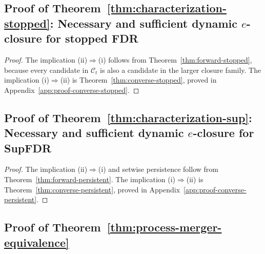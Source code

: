 \documentclass[11pt]{article}
\numberwithin{equation}{section}
\theoremstyle{plain}
\theoremstyle{definition}
\newcommand{\C}{\mathcal C}
\begin{document}
\subsection{Proof of Theorem~\ref{thm:characterization-stopped}: Necessary and sufficient dynamic \texorpdfstring{$e$}{e}-closure for stopped FDR}\label{app:proof-char-stopped}

\begin{proof}
The implication (ii)$\Rightarrow$(i) follows from Theorem~\ref{thm:forward-stopped}, because every candidate in $\C_t$ is also a candidate in the larger closure family. The implication (i)$\Rightarrow$(ii) is Theorem~\ref{thm:converse-stopped}, proved in Appendix~\ref{app:proof-converse-stopped}.
\end{proof}

\subsection{Proof of Theorem~\ref{thm:characterization-sup}: Necessary and sufficient dynamic \texorpdfstring{$e$}{e}-closure for SupFDR}\label{app:proof-char-sup}

\begin{proof}
The implication (ii)$\Rightarrow$(i) and setwise persistence follow from Theorem~\ref{thm:forward-persistent}. The implication (i)$\Rightarrow$(ii) is Theorem~\ref{thm:converse-persistent}, proved in Appendix~\ref{app:proof-converse-persistent}.
\end{proof}

\subsection{Proof of Theorem~\ref{thm:process-merger-equivalence}}\label{app:proof-process-merger}
\end{document}
